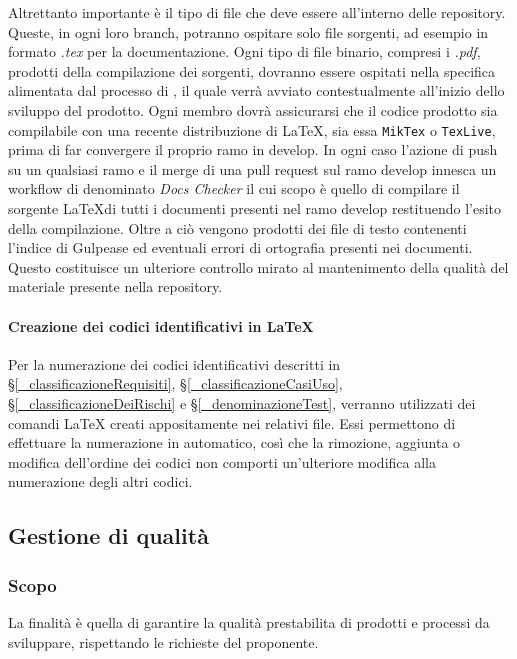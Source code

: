 Altrettanto importante è il tipo di file che deve essere all'interno delle repository. Queste, in ogni loro branch, potranno ospitare solo file sorgenti, ad esempio
in formato \textit{.tex} per la documentazione. Ogni tipo di file binario, compresi i \textit{.pdf}, prodotti della compilazione dei sorgenti, dovranno essere
ospitati nella specifica \textit{} alimentata dal processo di \textit{}, il quale verrà avviato contestualmente
all'inizio dello sviluppo del prodotto. Ogni membro dovrà assicurarsi che il codice prodotto sia compilabile con una recente distribuzione di \LaTeX,
sia essa \verb|MikTex| o \verb|TexLive|, prima di far convergere il proprio ramo in develop. In ogni caso l'azione di push su un qualsiasi ramo e il merge di una pull request sul ramo develop
innesca un workflow di  denominato \textit{Docs Checker} il cui scopo è quello di compilare il sorgente \LaTeX di tutti i documenti presenti nel ramo develop
restituendo l'esito della compilazione. Oltre a ciò vengono prodotti dei file di testo contenenti l'indice di Gulpease ed eventuali errori di ortografia presenti nei documenti.
Questo costituisce un ulteriore controllo mirato al mantenimento della qualità del materiale presente nella repository.

\paragraph{Creazione dei codici identificativi in \LaTeX} \label{_numerazioneCodiciIdentificativi}
Per la numerazione dei codici identificativi descritti in \S\ref{_classificazioneRequisiti}, \S\ref{_classificazioneCasiUso}, \S\ref{_classificazioneDeiRischi} e \S\ref{_denominazioneTest}, verranno utilizzati dei comandi \LaTeX{} creati appositamente nei relativi file. Essi permettono di effettuare la numerazione in automatico, così che la rimozione, aggiunta o modifica dell'ordine dei codici non comporti un'ulteriore modifica alla numerazione degli altri codici.


\subsection{Gestione di qualità} \label{_gestioneDiQualita}

\subsubsection{Scopo}
La finalità è quella di garantire la qualità prestabilita di prodotti e processi da sviluppare, rispettando le richieste del proponente.

